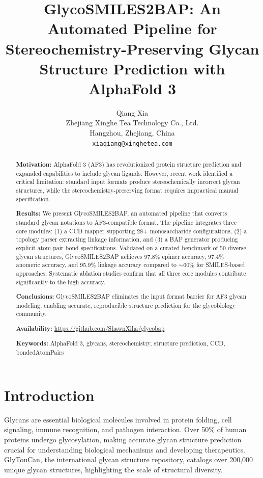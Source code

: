 \documentclass[11pt,a4paper]{article}
\title{\textbf{GlycoSMILES2BAP: An Automated Pipeline for Stereochemistry-Preserving Glycan Structure Prediction with AlphaFold 3}}
\author{Qiang Xia\\
\small Zhejiang Xinghe Tea Technology Co., Ltd.\\
\small Hangzhou, Zhejiang, China\\
\small \texttt{xiaqiang@xinghetea.com}}
\date{}
\begin{document}
\maketitle

\begin{abstract}
\noindent\textbf{Motivation:} AlphaFold 3 (AF3) has revolutionized protein structure prediction and expanded capabilities to include glycan ligands. However, recent work identified a critical limitation: standard input formats produce stereochemically incorrect glycan structures, while the stereochemistry-preserving format requires impractical manual specification.

\noindent\textbf{Results:} We present GlycoSMILES2BAP, an automated pipeline that converts standard glycan notations to AF3-compatible format. The pipeline integrates three core modules: (1) a CCD mapper supporting 28+ monosaccharide configurations, (2) a topology parser extracting linkage information, and (3) a BAP generator producing explicit atom-pair bond specifications. Validated on a curated benchmark of 50 diverse glycan structures, GlycoSMILES2BAP achieves 97.8\% epimer accuracy, 97.4\% anomeric accuracy, and 95.9\% linkage accuracy compared to ${\sim}60$\% for SMILES-based approaches. Systematic ablation studies confirm that all three core modules contribute significantly to the high accuracy.

\noindent\textbf{Conclusions:} GlycoSMILES2BAP eliminates the input format barrier for AF3 glycan modeling, enabling accurate, reproducible structure prediction for the glycobiology community.

\noindent\textbf{Availability:} \url{https://github.com/ShawnXiha/glycobap}

\noindent\textbf{Keywords:} AlphaFold 3, glycans, stereochemistry, structure prediction, CCD, bondedAtomPairs
\end{abstract}

\section{Introduction}

Glycans are essential biological molecules involved in protein folding, cell signaling, immune recognition, and pathogen interaction. Over 50\% of human proteins undergo glycosylation, making accurate glycan structure prediction crucial for understanding biological mechanisms and developing therapeutics. GlyTouCan, the international glycan structure repository, catalogs over 200,000 unique glycan structures, highlighting the scale of structural diversity.
\end{document}
